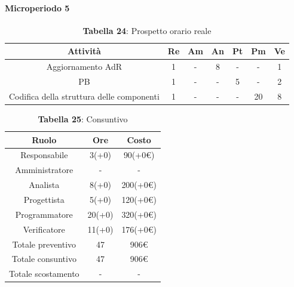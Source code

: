 \paragraph{Microperiodo 5}
\begin{table}[H]
	\centering
	\begin{tabular}{|c|c|c|c|c|c|c|}
		\hline
		\rowcolor{lighter-grayer}
		\textbf{Attività} & \textbf{Re}        & \textbf{Am}        & \textbf{An}        & \textbf{Pt}        & \textbf{Pm}        & \textbf{Ve}        \\ \hline
		
		Aggiornamento AdR                         & 1 & - & 8 & - & -  & 1 \\ \hline
		PB                                        & 1 & - & - & 5 & -  & 2 \\ \hline
		Codifica della struttura delle componenti & 1 & - & - & - & 20 & 8 \\ \hline		
		
	\end{tabular}
	\caption*{\textbf{Tabella 24}: Prospetto orario reale\\}
\end{table}

\begin{table}[H]
	\centering
	\renewcommand{\arraystretch}{1.5}
	\begin{tabular}{|c|c|c|}
		\hline
		\rowcolor{lighter-grayer}
		Ruolo & Ore & Costo \\ \hline
		Responsabile & 3(+0) & 90(+0\euro) \\ \hline
		Amministratore & - & - \\ \hline
		Analista & 8(+0) & 200(+0\euro) \\ \hline
		Progettista & 5(+0) & 120(+0\euro) \\ \hline
		Programmatore & 20(+0) & 320(+0\euro) \\ \hline
		Verificatore & 11(+0) & 176(+0\euro) \\ \hline
		Totale preventivo & 47 & 906\euro \\ \hline
		Totale consuntivo & 47 & 906\euro \\ \hline
		Totale scostamento & - & - \\ \hline
	\end{tabular}
	\caption*{\textbf{Tabella 25}: Consuntivo\\}
\end{table}

